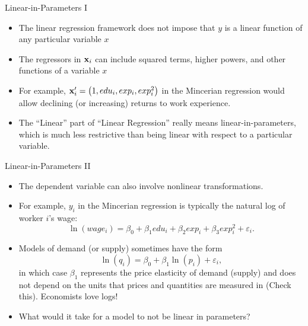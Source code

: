 
\begin{frame}{Linear-in-Parameters I}
\begin{itemize}
	\item The linear regression framework does not impose that $y$ is a linear function of any
	particular variable $x$

	\medskip
	\item The regressors in ${\bf x}_i$ can include squared terms, higher powers, and other functions of 
	a variable $x$

	\medskip
	\item For example, ${\bf x}_i' = \left(1,edu_i,exp_i,exp_i^2\right)$ in the Mincerian regression would allow
	declining (or increasing) returns to work experience. 

	\medskip
	\item The ``Linear'' part of ``Linear Regression'' really means linear-in-parameters, which is much less
	 restrictive than being linear with respect to a particular variable.
\end{itemize}
\end{frame}

\begin{frame}{Linear-in-Parameters II}
\begin{itemize}
	\item The dependent variable can also involve nonlinear transformations.

	\smallskip	
	\item For example, $y_{i}$ in the Mincerian regression is typically the natural log of worker $i$'s wage:\[
\ln \left(wage_{i}\right)=\beta_{0}+\beta_{1}edu_{i}+\beta_{2}exp_{i}+\beta_{3}exp_{i}^{2}+\varepsilon_{i}.
\]

	\smallskip
	\item Models of demand (or supply) sometimes have the form\[
		\ln \left( q_{i} \right) = \beta_0 + \beta_1 \ln \left( p_{i}\right) + \varepsilon_i,
	\]
	in which case $ \beta_1$ represents the price elasticity of demand (supply) and does not depend on the units that prices
	and quantities are measured in  (Check this). Economists love logs!
	

	\smallskip
	\item What would it take for a model to not be linear in parameters? 
\end{itemize}
\end{frame}

